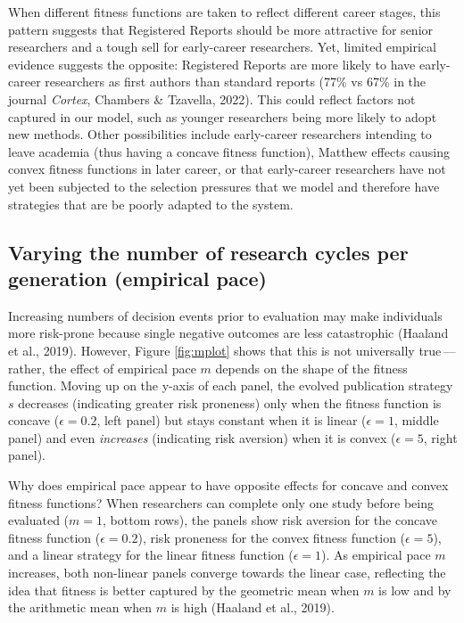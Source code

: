 \documentclass[
  british,
  a4paper,
  ,man,floatsintext]{apa6}
\begin{document}
When different fitness functions are taken to reflect different career stages,
this pattern suggests that Registered Reports should be more attractive for senior researchers and a tough sell for early-career researchers.
Yet, limited empirical evidence suggests the opposite:
Registered Reports are more likely to have early-career researchers as first authors than standard reports (77\% vs 67\% in the journal \emph{Cortex}, Chambers \& Tzavella, 2022).
This could reflect factors not captured in our model, such as younger researchers being more likely to adopt new methods.
Other possibilities include early-career researchers intending to leave academia (thus having a concave fitness function), Matthew effects causing convex fitness functions in later career, or that early-career researchers have not yet been subjected to the selection pressures that we model and therefore have strategies that are be poorly adapted to the system.

\subsection{Varying the number of research cycles per generation (empirical pace)}\label{varying-the-number-of-research-cycles-per-generation-empirical-pace}

Increasing numbers of decision events prior to evaluation may make individuals more risk-prone because single negative outcomes are less catastrophic (Haaland et al., 2019).
However, Figure \ref{fig:mplot} shows that this is not universally true\(\,\)---\(\,\)rather, the effect of empirical pace \(m\) depends on the shape of the fitness function.
Moving up on the y-axis of each panel, the evolved publication strategy \(s\) decreases (indicating greater risk proneness) only when the fitness function is concave (\(\epsilon = 0.2\), left panel) but stays constant when it is linear (\(\epsilon = 1\), middle panel) and even \emph{increases} (indicating risk aversion) when it is convex (\(\epsilon = 5\), right panel).

Why does empirical pace appear to have opposite effects for concave and convex fitness functions?
When researchers can complete only one study before being evaluated (\(m = 1\), bottom rows), the panels show risk aversion for the concave fitness function (\(\epsilon = 0.2\)), risk proneness for the convex fitness function (\(\epsilon = 5\)), and a linear strategy for the linear fitness function (\(\epsilon = 1\)).
As empirical pace \(m\) increases, both non-linear panels converge towards the linear case, reflecting the idea that fitness is better captured by the geometric mean when \(m\) is low and by the arithmetic mean when \(m\) is high (Haaland et al., 2019).
\end{document}
